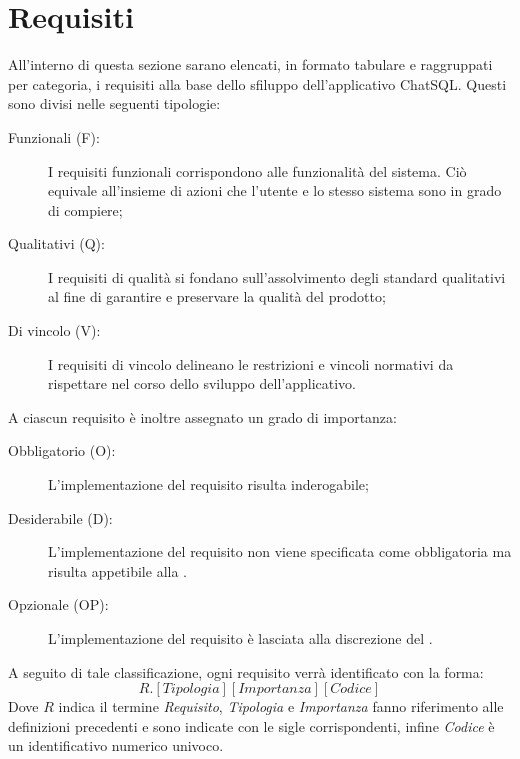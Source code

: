 \section{Requisiti}
All'interno di questa sezione sarano elencati, in formato tabulare e raggruppati per categoria, i requisiti alla base dello sfiluppo dell'applicativo ChatSQL. Questi sono divisi nelle seguenti tipologie:
\begin{description}
  \item[Funzionali (F):] I requisiti funzionali corrispondono alle funzionalità del sistema. Ciò equivale all’insieme di azioni che l’utente e lo stesso sistema sono in grado di compiere;
  \item[Qualitativi (Q):] I requisiti di qualità si fondano sull'assolvimento degli standard qualitativi al fine di garantire e preservare la qualità del prodotto;
  \item[Di vincolo (V):] I requisiti di vincolo delineano le restrizioni e vincoli normativi da rispettare nel corso dello sviluppo dell’applicativo.
\end{description}
A ciascun requisito è inoltre assegnato un grado di importanza:
\begin{description}
  \item[Obbligatorio (O):] L'implementazione del requisito risulta inderogabile;
  \item[Desiderabile (D):] L'implementazione del requisito non viene specificata come obbligatoria ma risulta appetibile alla .
  \item[Opzionale (OP):] L'implementazione del requisito è lasciata alla discrezione del .
\end{description}
A seguito di tale classificazione, ogni requisito verrà identificato con la forma:
\textbf{\[R.[Tipologia][Importanza][Codice]\]}
Dove \textbf{\(R\)} indica il termine \emph{Requisito}, \emph{Tipologia} e \emph{Importanza} fanno riferimento alle definizioni precedenti e sono indicate con le sigle corrispondenti, infine \emph{Codice} è un identificativo numerico univoco.


